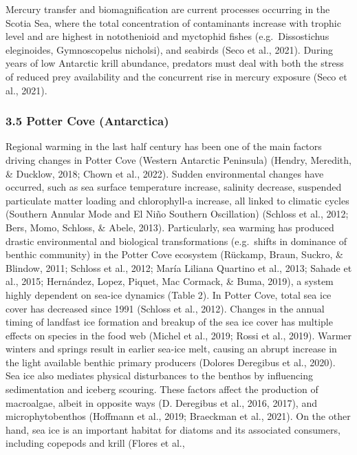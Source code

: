 \documentclass[
]{article}
\begin{document}
Mercury transfer and biomagnification are current processes occurring in
the Scotia Sea, where the total concentration of contaminants increase
with trophic level and are highest in notothenioid and myctophid fishes
(e.g.~Dissostichus eleginoides, Gymnoscopelus nicholsi), and seabirds
(Seco et al., 2021). During years of low Antarctic krill abundance,
predators must deal with both the stress of reduced prey availability
and the concurrent rise in mercury exposure (Seco et al., 2021).

\hypertarget{potter-cove-antarctica}{%
\subsubsection{3.5 Potter Cove
(Antarctica)}\label{potter-cove-antarctica}}

Regional warming in the last half century has been one of the main
factors driving changes in Potter Cove (Western Antarctic Peninsula)
(Hendry, Meredith, \& Ducklow, 2018; Chown et al., 2022). Sudden
environmental changes have occurred, such as sea surface temperature
increase, salinity decrease, suspended particulate matter loading and
chlorophyll-a increase, all linked to climatic cycles (Southern Annular
Mode and El Niño Southern Oscillation) (Schloss et al., 2012; Bers,
Momo, Schloss, \& Abele, 2013). Particularly, sea warming has produced
drastic environmental and biological transformations (e.g.~shifts in
dominance of benthic community) in the Potter Cove ecosystem (Rückamp,
Braun, Suckro, \& Blindow, 2011; Schloss et al., 2012; María Liliana
Quartino et al., 2013; Sahade et al., 2015; Hernández, Lopez, Piquet,
Mac Cormack, \& Buma, 2019), a system highly dependent on sea-ice
dynamics (Table 2). In Potter Cove, total sea ice cover has decreased
since 1991 (Schloss et al., 2012). Changes in the annual timing of
landfast ice formation and breakup of the sea ice cover has multiple
effects on species in the food web (Michel et al., 2019; Rossi et al.,
2019). Warmer winters and springs result in earlier sea-ice melt,
causing an abrupt increase in the light available benthic primary
producers (Dolores Deregibus et al., 2020). Sea ice also mediates
physical disturbances to the benthos by influencing sedimentation and
iceberg scouring. These factors affect the production of macroalgae,
albeit in opposite ways (D. Deregibus et al., 2016, 2017), and
microphytobenthos (Hoffmann et al., 2019; Braeckman et al., 2021). On
the other hand, sea ice is an important habitat for diatoms and its
associated consumers, including copepods and krill (Flores et al.,
\end{document}
